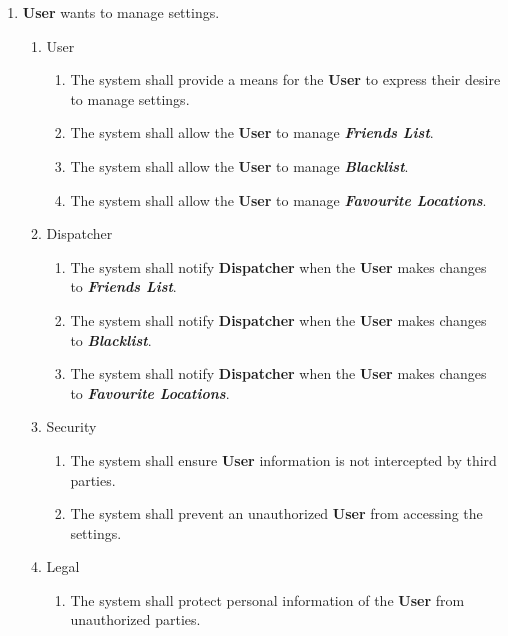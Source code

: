 \documentclass[english]{article}
\begin{document}
\begin{enumerate}[{BE}1.]
	\item \textbf{User} wants to manage settings.	
	\begin{enumerate}[{VP3}.1]
		\item User
			\begin{enumerate}
				\item The system shall provide a means for the \textbf{User} to express their desire to manage settings.
				\item The system shall allow the \textbf{User} to manage \textbf{\emph{Friends List}}.
				\item The system shall allow the \textbf{User} to manage \textbf{\emph{Blacklist}}.
				\item The system shall allow the \textbf{User} to manage \textbf{\emph{Favourite Locations}}.
			\end{enumerate}
		\item Dispatcher
			\begin{enumerate}
				\item The system shall notify \textbf{Dispatcher} when the \textbf{User} makes changes to \textbf{\emph{Friends List}}. 
				\item The system shall notify \textbf{Dispatcher} when the \textbf{User} makes changes to \textbf{\emph{Blacklist}}. 
				\item The system shall notify \textbf{Dispatcher} when the \textbf{User} makes changes to \textbf{\emph{Favourite Locations}}. 
			\end{enumerate}
		\item Security
			\begin{enumerate}
			\item The system shall ensure \textbf{User} information is not intercepted by third parties.
			\item The system shall prevent an unauthorized \textbf{User} from accessing the settings. 
			\end{enumerate}
		\item Legal
			\begin{enumerate}
				\item The system shall protect personal information of the \textbf{User} from unauthorized parties.
			\end{enumerate}
	\end{enumerate}


\end{enumerate}
\end{document}
